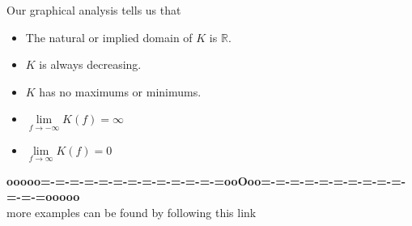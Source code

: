 \documentclass{ximera}
\begin{document}
\begin{example}
\begin{image}
\end{image}





Our graphical analysis tells us that

\begin{itemize}
\item The natural or implied domain of $K$ is $\mathbb{R}$.
\item $K$ is always decreasing.
\item $K$ has no maximums or minimums.
\item $\lim\limits_{f \to -\infty} K(f) = \infty$
\item $\lim\limits_{f \to \infty} K(f) = 0$
\end{itemize}


\end{example}












\begin{center}
\textbf{\textcolor{green!50!black}{ooooo=-=-=-=-=-=-=-=-=-=-=-=-=ooOoo=-=-=-=-=-=-=-=-=-=-=-=-=ooooo}} \\

more examples can be found by following this link\\ 

\end{center}
\end{document}
